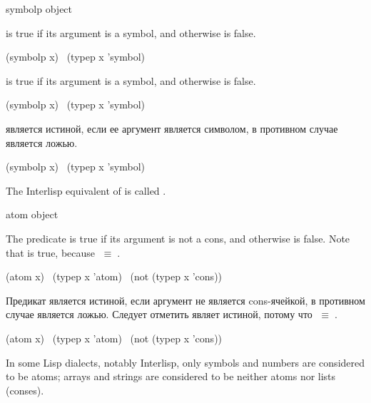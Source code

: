 \begin{defun}[Function]
symbolp object

 is true if its argument is a symbol,
and otherwise is false.
\begin{lisp}
(symbolp x) \EQ\ (typep x 'symbol)
\end{lisp}

 is true if its argument is a symbol,
and otherwise is false.
\begin{lisp}
(symbolp x) \EQ\ (typep x 'symbol)
\end{lisp}

 является истиной, если ее аргумент является символом, в противном
случае является ложью.
\begin{lisp}
(symbolp x) \EQ\ (typep x 'symbol)
\end{lisp}

\beforenoterule
\begin{incompatibility}
The Interlisp equivalent of  is
called .
\end{incompatibility}
\afternoterule
\end{defun}

\begin{defun}[Function]
atom object

The predicate  is true if its argument is not a cons,
and otherwise is false.
Note that  is true, because {\emptylist}$\;\equiv\;${\nil}.
\begin{lisp}
(atom x) \EQ\ (typep x 'atom) \EQ\ (not (typep x 'cons))
\end{lisp}

Предикат  является истиной, если аргумент не является cons-ячейкой, в
противном случае является ложью.
Следует отметить  являет истиной, потому что
{\emptylist}$\;\equiv\;${\nil}.
\begin{lisp}
(atom x) \EQ\ (typep x 'atom) \EQ\ (not (typep x 'cons))
\end{lisp}

\beforenoterule
\begin{incompatibility}
In some Lisp dialects, notably Interlisp,
only symbols and numbers are considered to be atoms; arrays
and strings are considered to be neither atoms nor lists (conses).
\end{incompatibility}
\afternoterule
\end{defun}

